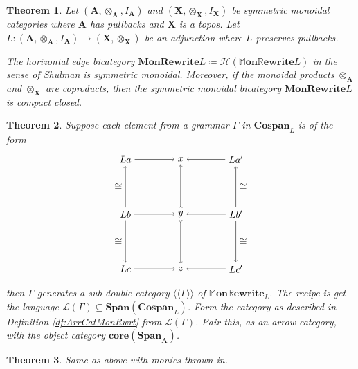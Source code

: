 \documentclass[]{amsart}
\newcommand{\A}{\cat{A}}
\newcommand{\X}{\cat{X}}
\newcommand{\core}{\mathbf{core}}
\newcommand{\cat}[1]{\mathbf{#1}}
\newcommand{\from}{\colon}
\newcommand{\Span}{\mathbf{Span}}
\newcommand{\Cospan}{\mathbf{Cospan}}
\newcommand{\MonRewrite}{ \mathbf{MonRewrite}}
\newcommand{\MMonRewrite}{ \mathbb{M}\mathbf{on}\mathbb{R}\mathbf{ewrite} }
\newtheorem{theorem}{Theorem}[section]
\theoremstyle{remark}
\theoremstyle{definition}
\begin{document}
\begin{theorem} \label{thm_bi-mon-rewrite-isSMCC}
  Let $ (\A, \otimes_{ \A }, I_{ \A }) $ and
  $ (\X, \otimes_{\X}, I_{\X}) $ be symmetric monoidal categories
  where $ \A $ has pullbacks and $ \X $ is a topos. Let
  $ L \from (\A, \otimes_{ \A }, I_{ \A }) \to (\X, \otimes_{\X}) $ be
  an adjunction where $ L $ preserves pullbacks.
	
	The horizontal edge bicategory
        $ \MonRewrite{L} \coloneqq \mathcal{H} \left( \MMonRewrite{L}
        \right) $ in the sense of Shulman is symmetric monoidal.
        Moreover, if the monoidal products $ \otimes_{\A} $ and
        $ \otimes_{\X} $ are coproducts, then the symmetric monoidal
        bicategory $ \MonRewrite{L} $ is compact closed.
\end{theorem}

\begin{theorem}
  Suppose each element from a grammar $ \Gamma $ in $ \Cospan_{L} $ is
  of the form
	\[
	\begin{tikzpicture}
          \node (a) at (-1,1) {$ L a $};
          \node (x) at (1,1) {$ x $};
          \node (a') at (3,1) {$ L a'$};
          \node (b) at (-1,-1) {$ L b $};
          \node (y) at (1,-1) {$ y $};
          \node (b') at (3,-1) {$ Lb' $};
          \node (c) at (-1,-3) {$ L c $};
          \node (z) at (1,-3) {$ z $};
          \node (c') at (3,-3) {$ L c' $};
          \draw [->] (a) to (x);
          \draw [->] (a') to (x);
          \draw [->] (b) to (y);
          \draw [->] (b') to (y);
          \draw [->] (c) to (z);
          \draw [->] (c') to (z);
          \draw [->] (b) to node [left] {$ \cong $} (a);
          \draw [->] (b) to node [left] {$ \cong $} (c);
          \draw [>->] (y) to (x);
          \draw [>->] (y) to (z);
          \draw [->] (b') to node [right] {$ \cong $} (a');
          \draw [->] (b') to node [right] {$ \cong $} (c');
	\end{tikzpicture}
	\]
	then $ \Gamma $ generates a sub-double category
        $ \langle \langle \Gamma \rangle \rangle $ of
        $ \MMonRewrite_{L} $.  The recipe is get the language
        $ \mathcal{L}(\Gamma) \subseteq \Span {(\Cospan_{L})} $. Form
        the category as described in Definition \ref{df:ArrCatMonRwrt}
        from $ \mathcal{L}(\Gamma) $. Pair this, as an arrow category,
        with the object category $ \core (\Span_{\A}) $.
\end{theorem}

\begin{theorem}
  Same as above with monics thrown in.
\end{theorem}

 

\end{document}
